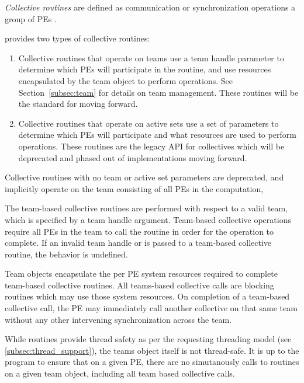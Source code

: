 \emph{Collective routines} are defined as  communication or synchronization
operations   a group of \acp{PE} .

{\color{Green}
\openshmem provides two types of collective routines:

\begin{enumerate}
\item Collective routines that operate on teams use a team handle parameter to determine
which \acp{PE} will participate in the routine, and use resources encapsulated by the team object
to perform operations. See Section~\ref{subsec:team} for details on team management.
These routines will be the standard for \openshmem moving forward.
\item Collective routines that operate on active sets use a set of parameters to determine
which \acp{PE} will participate and what resources are used to perform operations. These routines
are the legacy API for collectives which will be deprecated and phased out of
implementations moving forward.
\end{enumerate}

Collective routines with no team or active set parameters are deprecated,
and implicitly operate on the team consisting of all \acp{PE} in the computation,

The team-based collective routines are performed with respect to a valid
\openshmem team, which is specified by a team handle argument.
Team-based collective operations require all \acp{PE} in the team to call
the routine in order for the operation to complete. If an invalid team handle
or  is passed to a team-based collective
routine, the behavior is undefined.

Team objects encapsulate the per \ac{PE} system resources required to complete
team-based collective routines.
All \openshmem teams-based collective calls are blocking routines which may use those
system resources. On completion of a team-based collective call, the \ac{PE} may
immediately call another collective on that same team without any other intervening
synchronization across the team.

While \openshmem routines provide thread safety as per the requesting threading model
(see \ref{subsec:thread_support}), the teams object itself is not thread-safe. It is up
to the program to ensure that on a given \ac{PE}, there are no simutanously calls to routines
on a given team object, including all team based collective calls.

}
